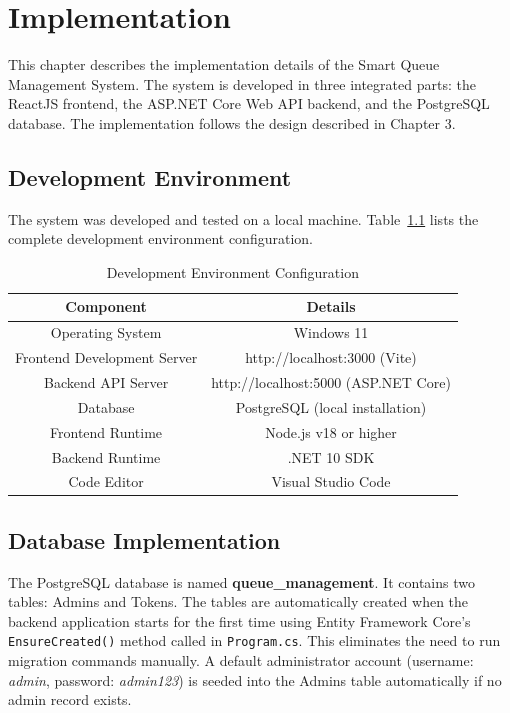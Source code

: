 
\chapter{Implementation}

This chapter describes the implementation details of the Smart Queue Management System. The system is developed in three integrated parts: the ReactJS frontend, the ASP.NET Core Web API backend, and the PostgreSQL database. The implementation follows the design described in Chapter 3.

\section{Development Environment}

The system was developed and tested on a local machine. Table~\ref{tab:devenv} lists the complete development environment configuration.

\begin{table}[htbp]
    \centering
    \begin{tabular}{|c|c|}
        \hline
        \textbf{Component} & \textbf{Details} \\
        \hline
        Operating System & Windows 11 \\
        \hline
        Frontend Development Server & http://localhost:3000 (Vite) \\
        \hline
        Backend API Server & http://localhost:5000 (ASP.NET Core) \\
        \hline
        Database & PostgreSQL (local installation) \\
        \hline
        Frontend Runtime & Node.js v18 or higher \\
        \hline
        Backend Runtime & .NET 10 SDK \\
        \hline
        Code Editor & Visual Studio Code \\
        \hline
    \end{tabular}
    \caption{Development Environment Configuration}
    \label{tab:devenv}
\end{table}

\section{Database Implementation}

The PostgreSQL database is named \textbf{queue\_management}. It contains two tables: Admins and Tokens. The tables are automatically created when the backend application starts for the first time using Entity Framework Core's \texttt{EnsureCreated()} method called in \texttt{Program.cs}. This eliminates the need to run migration commands manually. A default administrator account (username: \textit{admin}, password: \textit{admin123}) is seeded into the Admins table automatically if no admin record exists.

